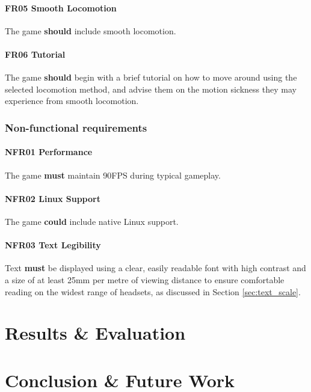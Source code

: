 \documentclass[sigconf,authordraft]{acmart}
\begin{document}
\paragraph{FR05 Smooth Locomotion}
The game \textbf{should} include smooth locomotion.

\paragraph{FR06 Tutorial}
The game \textbf{should} begin with a brief tutorial on how to move around
using the selected locomotion method, and advise them on the motion sickness
they may experience from smooth locomotion.

\subsubsection{Non-functional requirements}

\paragraph{\label{sec:nfr_performance}NFR01 Performance}
The game \textbf{must} maintain 90FPS during typical gameplay.

\paragraph{NFR02 Linux Support}
The game \textbf{could} include native Linux support.

\paragraph{NFR03 Text Legibility}
Text \textbf{must} be displayed using a clear, easily readable font with high
contrast and a size of at least 25mm per metre of viewing distance to ensure
comfortable reading on the widest range of headsets, as discussed in Section
\ref{sec:text_scale}.

\section{Results \& Evaluation}

\section{Conclusion \& Future Work}

\begin{acks}

\end{acks}
\end{document}
